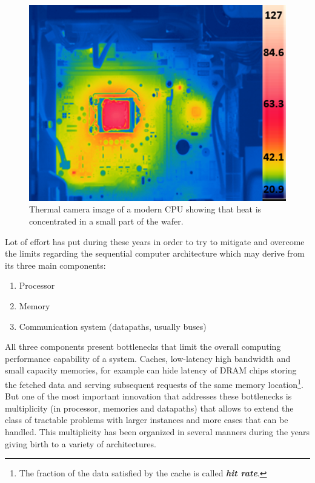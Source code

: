 \begin{figure}
\centering
\includegraphics[scale=0.6]{./images/parallel_programming/heat_cpu}
\caption{Thermal camera image of a modern CPU showing that heat is concentrated in a small part of the wafer.}\label{fig:tempCPU_thermal}
\end{figure}

Lot of effort has put during these years in order to try to mitigate and overcome the limits regarding the sequential computer architecture which may derive from its three main components:
\begin{enumerate}

\item  Processor

\item Memory

\item  Communication system (datapaths, usually buses)
\end{enumerate}

All three components present bottlenecks that limit the overall computing performance capability of a system. Caches, low-latency high bandwidth and small capacity memories, for example can hide latency of DRAM chips storing the fetched data and serving subsequent requests of the same memory location\footnote{The fraction of the data satisfied by the cache is called \textit{\textbf{hit rate}}.}. But one of the most important innovation that addresses these bottlenecks is multiplicity (in processor, memories and datapaths) that allows to extend the class of tractable problems with larger instances and more cases that can be handled. This multiplicity has been organized in several manners during the years giving birth to a variety of architectures.

